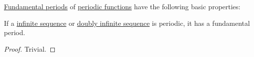 \begin{proposition}\label{thm:def:fundamental_function_period}
  \hyperref[def:fundamental_function_period]{Fundamental periods} of \hyperref[def:periodic_function]{periodic functions} have the following basic properties:
  \begin{thmenum}
     If a \hyperref[def:sequence]{infinite sequence} or \hyperref[def:doubly_infinite_sequence]{doubly infinite sequence} is periodic, it has a fundamental period.
  \end{thmenum}
\end{proposition}
\begin{proof}
   Trivial.
\end{proof}

